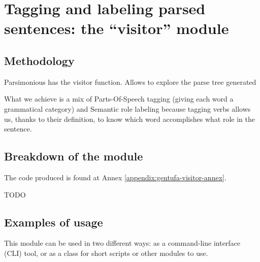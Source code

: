 \chapter{Tagging and labeling parsed sentences: the ``visitor'' module}
\label{chap:visitor-module}

\section{Methodology}

Parsimonious has the visitor function. Allows to explore the parse tree generated

What we achieve is a mix of Parts-Of-Speech tagging (giving each word a grammatical category) and Semantic role labeling
because tagging verbs allows us, thanks to their definition, to know which word accomplishes what role in the sentence.



\section{Breakdown of the module}
\label{sec:visitor-code-breakdown}

The code produced is found at Annex \ref{appendix:gentufa-visitor-annex}.

TODO

\newpage

\section{Examples of usage}

This module can be used in two different ways: as a command-line interface (CLI) tool, or as a class for short scripts or other modules to use.

